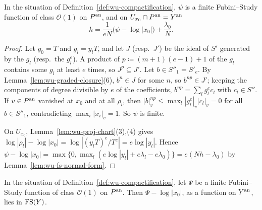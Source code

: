 \begin{lemma}\label{lem:wu-boundary-presentation}
\leanok
{}
In the situation of Definition~\ref{def:wu-compactification}, $\psi$ is a finite Fubini--Study function of class
$\mathcal O(1)$ on $P^{\mathrm{an}}$, and on $U_{x_0}\cap P^{\mathrm{an}}=Y^{\mathrm{an}}$
\[
h=\frac1{eN}\bigl(\psi-\log|x_0|\bigr)+\frac{\lambda_0}N .
\]
\end{lemma}

\begin{proof}
Let $g_0=T$ and $g_l=y_lT$, and let $J$ (resp.\ $J'$) be the ideal of $S'$ generated by the $g_l$ (resp.\ the
$g_l^e$). A product of $p\coloneqq(m+1)(e-1)+1$ of the $g_l$ contains some $g_l$ at least $e$ times, so $J^p\subseteq J'$.
Let $b\in S''_1=S'_e$. By Lemma~\ref{lem:wu-graded-closure}(6), $b^n\in J$ for some $n$, so $b^{np}\in J'$; keeping
the components of degree divisible by $e$ of the coefficients, $b^{np}=\sum_lg_l^ec_l$ with $c_l\in S''$. If
$v\in P^{\mathrm{an}}$ vanished at $x_0$ and at all $\rho_l$, then $|b|_v^{np}\le\max_l|g_l^e|_v|c_l|_v=0$ for all
$b\in S''_1$, contradicting $\max_i|x_i|_v=1$. So $\psi$ is finite.

On $U_{x_0}$, Lemma~\ref{lem:wu-proj-chart}(3),(4) gives $\log|\rho_l|-\log|x_0|=\log|(y_lT)^e/T^e|=e\log|y_l|$. Hence
$\psi-\log|x_0|=\max\{0,\max_l(e\log|y_l|+e\lambda_l-e\lambda_0)\}=e(Nh-\lambda_0)$ by
Lemma~\ref{lem:wu-fs-normal-form}.
\end{proof}

\begin{lemma}\label{lem:wu-fs-restriction}
\leanok
{}
In the situation of Definition~\ref{def:wu-compactification}, let $\Psi$ be a finite Fubini--Study function of class
$\mathcal O(1)$ on $P^{\mathrm{an}}$. Then $\Psi-\log|x_0|$, as a function on $Y^{\mathrm{an}}$, lies in $\mathrm{FS}(Y)$.
\end{lemma}

